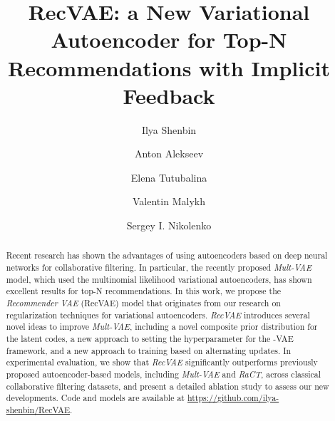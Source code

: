 \documentclass[sigconf,authorversion]{acmart}
\begin{document}
\title{RecVAE: a New Variational Autoencoder for Top-N Recommendations with Implicit Feedback}

\author{Ilya Shenbin}

\author{Anton Alekseev}

\author{Elena Tutubalina}

\author{Valentin Malykh}

\author{Sergey I. Nikolenko}

\renewcommand{\shortauthors}{Shenbin et al.}

\begin{abstract}
Recent research has shown the advantages of using autoencoders based on deep neural networks for collaborative filtering. In particular, the recently proposed \emph{Mult-VAE} model, which used the multinomial likelihood variational autoencoders, has shown excellent results for top-N recommendations. In this work, we propose the \emph{Recommender VAE} (RecVAE) model that originates from our research on regularization techniques for variational autoencoders. \emph{RecVAE} introduces several novel ideas to improve \emph{Mult-VAE}, including a novel composite prior distribution for the latent codes, a new approach to setting the  hyperparameter for the -VAE framework, and a new approach to training based on alternating updates. In experimental evaluation, we show that \emph{RecVAE} significantly outperforms previously proposed autoencoder-based models, including \emph{Mult-VAE} and \emph{RaCT}, across classical collaborative filtering datasets, and present a detailed ablation study to assess our new developments. Code and models are available at \url{https://github.com/ilya-shenbin/RecVAE}.
\end{abstract}
\end{document}
